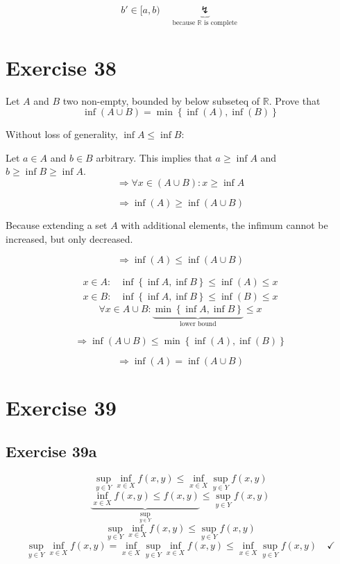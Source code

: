 \documentclass[a4paper]{article}
\theoremstyle{definition}
\newcommand\set[1]{\left\{#1\right\}}
\begin{document}
\[ b' \in [a,b) \quad\underbrace{\lightning}_{\text{because } \mathbb R \text{ is complete}} \]

\section{Exercise 38}

\begin{ex}
  Let $A$ and $B$ two non-empty, bounded by below subseteq of $\mathbb R$. Prove that
  \[ \inf(A \cup B) = \min\set{\inf(A), \inf(B)} \]
\end{ex}

Without loss of generality, $\inf{A} \leq \inf{B}$:

Let $a \in A$ and $b \in B$ arbitrary.
This implies that $a \geq \inf{A}$ and $b \geq \inf{B} \geq \inf{A}$.
\[ \Rightarrow \forall x \in (A \cup B): x \geq \inf{A} \]

\[ \Rightarrow \inf(A) \geq \inf(A \cup B) \]

Because extending a set $A$ with additional elements,
the infimum cannot be increased, but only decreased.

\[ \Rightarrow \inf(A) \leq \inf(A \cup B) \]

\begin{align*}
  x \in A: & \inf\set{\inf{A}, \inf{B}} \leq \inf(A) \leq x \\
  x \in B: & \inf\set{\inf{A}, \inf{B}} \leq \inf(B) \leq x
\end{align*}
\[ \forall x \in A \cup B: \underbrace{\min\set{\inf{A}, \inf{B}}}_{\text{lower bound}} \leq x \]

\[ \Rightarrow \inf(A \cup B) \leq \min\set{\inf(A), \inf(B)} \]

\[ \Rightarrow \inf(A) = \inf(A \cup B) \]

\section{Exercise 39}
\subsection{Exercise 39a}
\[ \sup_{y \in Y} \inf_{x \in X} f(x, y) \leq \inf_{x \in X} \sup_{y \in Y} f(x, y) \]
\[ \underbrace{\inf_{x \in X} f(x, y) \leq f(x, y)}_{\sup_{y \in Y}} \leq \sup_{y \in Y} f(x, y) \]
\[ \sup_{y \in Y} \inf_{x \in X} f(x, y) \leq \sup_{y \in Y} f(x, y) \]
\[ \sup_{y \in Y}{\inf_{x \in X} f(x, y)} = \inf_{x \in X} \sup_{y \in Y} \inf_{x \in X} f(x, y) \leq \inf_{x \in X} \sup_{y \in Y} f(x, y) \quad \checkmark \]
\end{document}
